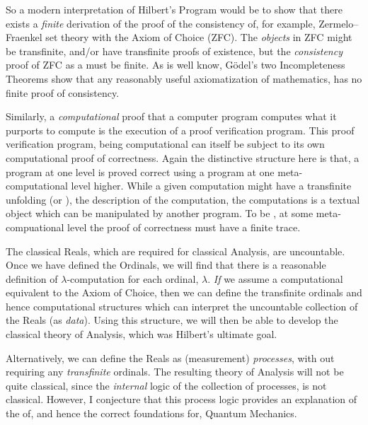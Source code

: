 So a modern interpretation of Hilbert's Program would be to show that 
there exists a \emph{finite} derivation of the proof of the consistency 
of, for example, Zermelo–Fraenkel set theory with the Axiom of Choice 
(ZFC). The \emph{objects} in ZFC might be transfinite, and/or have 
transfinite proofs of existence, but the \emph{consistency} proof of ZFC as 
a  must be finite. As is well know, G\"odel's two 
Incompleteness Theorems show that any reasonably useful axiomatization of 
mathematics, has no finite proof of consistency. 

Similarly, a \emph{computational} proof that a computer program computes 
what it purports to compute is the execution of a proof verification 
program. This proof verification program, being computational can itself 
be subject to its own computational proof of correctness. Again the 
distinctive structure here is that, a program at one level is proved 
correct using a program at one meta-computational level higher. While a 
given computation might have a transfinite unfolding (or ), 
the description of the computation, the computations  is a 
textual object which can be manipulated by another program. To be 
, at some meta-compuational level the proof of correctness 
must have a finite trace. 


The classical Reals, which are required for classical Analysis, are 
uncountable. Once we have defined the Ordinals, we will find that there is 
a reasonable definition of $\lambda$-computation for each ordinal, 
$\lambda$. \emph{If} we assume a computational equivalent to the 
 Axiom of Choice, then we can define the transfinite 
ordinals and hence computational structures which can interpret the 
uncountable collection of the Reals (as \emph{data}). Using this 
structure, we will then be able to develop the classical theory of 
Analysis, which was Hilbert's ultimate goal. 

Alternatively, we can define the Reals as (measurement) \emph{processes}, 
with out requiring any \emph{transfinite} ordinals. The resulting theory 
of Analysis will not be quite classical, since the \emph{internal} logic 
of the collection of processes, is not classical. However, I conjecture 
that this process logic provides an explanation of the  
of, and hence the correct foundations for, Quantum Mechanics. 

